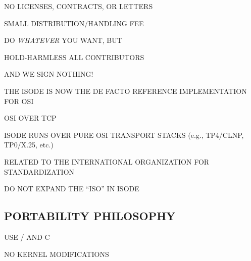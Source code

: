 \begin{bwslide}

\begin{nrtc}
\item	NO LICENSES, CONTRACTS, OR LETTERS

\item	SMALL DISTRIBUTION/HANDLING FEE

\item	DO \emph{WHATEVER} YOU WANT, BUT

\item	HOLD-HARMLESS ALL CONTRIBUTORS

\item	AND WE SIGN NOTHING!
\end{nrtc}
\end{bwslide}


\begin{bwslide}

\begin{nrtc}
\item	THE ISODE IS NOW THE DE FACTO REFERENCE IMPLEMENTATION FOR OSI
\end{nrtc}
\end{bwslide}


\begin{bwslide}

\begin{nrtc}
\item	OSI OVER TCP
    \begin{nrtc}
    \item	ISODE RUNS OVER PURE OSI TRANSPORT STACKS
		(e.g., TP4/CLNP, TP0/X.25, etc.)
    \end{nrtc}

\item	RELATED TO THE INTERNATIONAL ORGANIZATION FOR STANDARDIZATION
    \begin{nrtc}
    \item	DO NOT EXPAND THE ``ISO'' IN ISODE
    \end{nrtc}
\end{nrtc}
\end{bwslide}





\begin{bwslide}
\part*	{PORTABILITY PHILOSOPHY}\bf

\begin{nrtc}
\item	USE \unix/ AND C

\item	NO KERNEL MODIFICATIONS
\end{nrtc}
\end{bwslide}


